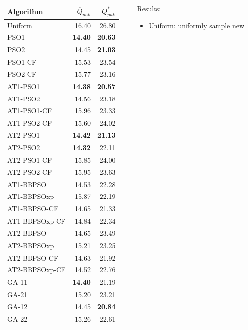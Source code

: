 \documentclass[xcolor=dvipsnames]{beamer}
\begin{document}
\begin{frame}
  \begin{columns}
    \begin{column}{0.4\textwidth}
  \begin{scriptsize}
\begin{tabular}{lrr}
Algorithm & $\overline{Q}_{puk}$ & $Q^*_{puk}$ \\\hline
Uniform & 16.40 & 26.80 \\\hline
PSO1 & \bf{14.40} & \bf{20.63} \\
  PSO2 & 14.45 & \bf{21.03}\\
  PSO1-CF & 15.53 & 23.54 \\
  PSO2-CF & 15.77 & 23.16 \\
   \hline
AT1-PSO1 & \bf{14.38} & \bf{20.57} \\
  AT1-PSO2 & 14.56 & 23.18 \\
  AT1-PSO1-CF & 15.96 & 23.33 \\
  AT1-PSO2-CF & 15.60 & 24.02 \\
   \hline
AT2-PSO1 & \bf{14.42} & \bf{21.13} \\
  AT2-PSO2 & \bf{14.32} & 22.11 \\
  AT2-PSO1-CF & 15.85 & 24.00 \\
  AT2-PSO2-CF & 15.95 & 23.63 \\
   \hline
AT1-BBPSO & 14.53 & 22.28 \\
  AT1-BBPSOxp & 15.87 & 22.19 \\
  AT1-BBPSO-CF & 14.65 & 21.33 \\
  AT1-BBPSOxp-CF & 14.84 & 22.34 \\
   \hline
AT2-BBPSO & 14.65 & 23.49 \\
  AT2-BBPSOxp & 15.21 & 23.25 \\
  AT2-BBPSO-CF & 14.63 & 21.92\\
  AT2-BBPSOxp-CF & 14.52 & 22.76 \\
   \hline
GA-11 & \bf{14.40} & 21.19 \\
  GA-21 & 15.20 & 23.21 \\
  GA-12 & 14.45 & \bf{20.84} \\
  GA-22 & 15.26 & 22.61 \\
\hline
\end{tabular}
\end{scriptsize}
\end{column}
\begin{column}{0.55\textwidth}
  Results:
  \begin{itemize}
  \item Uniform: uniformly sample new \\

\end{itemize}
\end{column}
\end{columns}
\end{frame}
\end{document}
